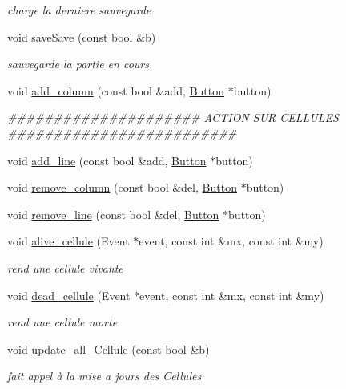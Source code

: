 \begin{DoxyCompactItemize}
\begin{DoxyCompactList}\small\item\em charge la derniere sauvegarde \end{DoxyCompactList}\item 
void \hyperlink{classGameModel_a7ffbcb21094a86ec443771b938f62e9c}{saveSave} (const bool \&b)
\begin{DoxyCompactList}\small\item\em sauvegarde la partie en cours \end{DoxyCompactList}\item 
void \hyperlink{classGameModel_ab9b516419e0f08671936f6538312e1a6}{add\_\-column} (const bool \&add, \hyperlink{classButton}{Button} $\ast$button)
\begin{DoxyCompactList}\small\item\em \#\#\#\#\#\#\#\#\#\#\#\#\#\#\#\#\#\#\#\#\# ACTION SUR CELLULES \#\#\#\#\#\#\#\#\#\#\#\#\#\#\#\#\#\#\#\#\#\#\#\#\# \end{DoxyCompactList}\item 
void \hyperlink{classGameModel_adff19e91eddacd4331781c7d55b58c75}{add\_\-line} (const bool \&add, \hyperlink{classButton}{Button} $\ast$button)
\item 
void \hyperlink{classGameModel_a9bc768a85ec8c90616365b68f5ece408}{remove\_\-column} (const bool \&del, \hyperlink{classButton}{Button} $\ast$button)
\item 
void \hyperlink{classGameModel_a292b2fa989688840f20bd5c47b1a4f83}{remove\_\-line} (const bool \&del, \hyperlink{classButton}{Button} $\ast$button)
\item 
void \hyperlink{classGameModel_a000994423f7d19e3bbc6a142317fa17a}{alive\_\-cellule} (Event $\ast$event, const int \&mx, const int \&my)
\begin{DoxyCompactList}\small\item\em rend une cellule vivante \end{DoxyCompactList}\item 
void \hyperlink{classGameModel_adc1ba45daf510fe428e2370bd5662156}{dead\_\-cellule} (Event $\ast$event, const int \&mx, const int \&my)
\begin{DoxyCompactList}\small\item\em rend une cellule morte \end{DoxyCompactList}\item 
void \hyperlink{classGameModel_a9e8d3cce2fed7d6c3aba58b3a69a6876}{update\_\-all\_\-Cellule} (const bool \&b)
\begin{DoxyCompactList}\small\item\em fait appel à la mise a jours des Cellules \end{DoxyCompactList}\item 

\end{DoxyCompactItemize}
